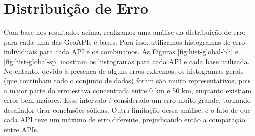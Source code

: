 \section{Distribuição de Erro}

Com base nos resultados acima, realizamos uma análise da distribuição de erro para cada uma das GeoAPIs e bases. Para isso, utilizamos histogramas de erro individuais para cada API e os combinamos. As Figuras \ref{fig:hist-global-bh} e \ref{fig:hist-global-sp} mostram os histogramas para cada API e cada base utilizada. No entanto, devido à presença de alguns erros extremos, os histogramas gerais (que continham todo o conjunto de dados) foram são muito representativos, pois a maior parte do erro estava concentrada entre 0 km e 50 km, enquanto existiam erros bem maiores. Esse intervalo é considerado um erro muito grande, tornando desafiador tirar conclusões sólidas. Outra limitação dessa análise, é o fato de que cada API teve um máximo de erro diferente, prejudicando então a comparação entre APIs.

